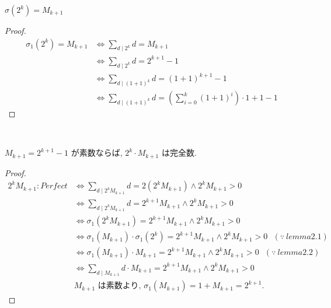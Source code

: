 \begin{lemma}\label{sigma_two_pow_eq_mersenne_succ}\leanok

\(\sigma(2^k) = M_{k+1}\)

\end{lemma}

\begin{proof}
\begin{align*}
  \sigma_1(2^k) = M_{k+1} &\Leftrightarrow \sum_{d \mid 2^k} d = M_{k+1}\\
                          &\Leftrightarrow \sum_{d \mid 2^k} d = 2^{k+1} - 1\\
                          &\Leftrightarrow \sum_{d \mid (1+1)^k} d = (1+1)^{k+1} - 1\\
                          &\Leftrightarrow \sum_{d \mid (1+1)^k} d = (\sum_{i=0}^{k}(1+1)^i) \cdot 1 + 1 - 1
\end{align*}
\end{proof}


\begin{theorem}[Euclid I]\label{perfect_two_pow_mul_mersenne_of_prime}
  \leanok~\

\(M_{k+1} = 2^{k+1} - 1\) が素数ならば, \(2^k \cdot M_{k+1}\) は完全数.

\end{theorem}

\begin{proof}
\begin{align*}
2^kM_{k+1} : Perfect &\Leftrightarrow \sum_{d \mid 2^kM_{k+1}} d = 2(2^kM_{k+1}) \wedge 2^kM_{k+1} > 0\\
                     &\Leftrightarrow \sum_{d \mid 2^kM_{k+1}} d = 2^{k+1}M_{k+1} \wedge 2^kM_{k+1} > 0\\
                     &\Leftrightarrow \sigma_1(2^kM_{k+1}) = 2^{k+1}M_{k+1} \wedge 2^kM_{k+1} > 0\\
                     &\Leftrightarrow \sigma_1(M_{k+1}) \cdot \sigma_1(2^k) = 2^{k+1}M_{k+1} \wedge 2^kM_{k+1} > 0~~~(\because~lemma2.1)\\
                     &\Leftrightarrow \sigma_1(M_{k+1}) \cdot M_{k+1} = 2^{k+1}M_{k+1} \wedge 2^kM_{k+1} > 0~~~(\because~lemma2.2)\\
                     &\Leftrightarrow \sum_{d \mid M_{k+1}} d \cdot M_{k+1} = 2^{k+1}M_{k+1} \wedge 2^kM_{k+1} > 0\\
&\text{\(M_{k+1}\) は素数より, \(\sigma_1(M_{k+1}) = 1 + M_{k+1} = 2^{k+1}\).}
\end{align*}
\end{proof}


